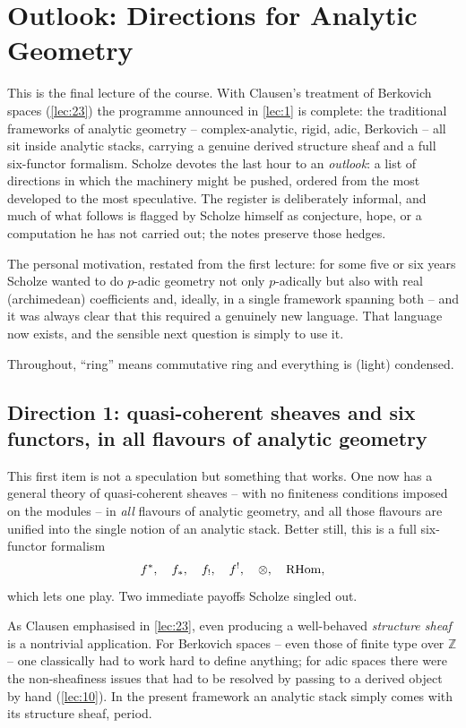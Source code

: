 \section{Outlook: Directions for Analytic Geometry}
\label{lec:24}

This is the final lecture of the course. With Clausen's treatment of Berkovich
spaces (\cref{lec:23}) the programme announced in \cref{lec:1} is complete: the
traditional frameworks of analytic geometry -- complex-analytic, rigid, adic,
Berkovich -- all sit inside analytic stacks, carrying a genuine derived
structure sheaf and a full six-functor formalism. Scholze devotes the last hour
to an \emph{outlook}: a list of directions in which the machinery might be
pushed, ordered from the most developed to the most speculative. The register
is deliberately informal, and much of what follows is flagged by Scholze himself
as conjecture, hope, or a computation he has not carried out; the notes preserve
those hedges.

The personal motivation, restated from the first lecture: for some five or six
years Scholze wanted to do $p$-adic geometry not only $p$-adically but also with
real (archimedean) coefficients and, ideally, in a single framework spanning
both -- and it was always clear that this required a genuinely new language.
That language now exists, and the sensible next question is simply to use it.

Throughout, ``ring'' means commutative ring and everything is (light) condensed.

\subsection{Direction 1: quasi-coherent sheaves and six functors, in all
flavours of analytic geometry}
\label{subsec:24:qcoh}

This first item is not a speculation but something that works. One now has a
general theory of quasi-coherent sheaves -- with no finiteness conditions
imposed on the modules -- in \emph{all} flavours of analytic geometry, and all
those flavours are unified into the single notion of an analytic stack. Better
still, this is a full six-functor formalism
\begin{equation*}
f^*,\quad f_*,\quad f_!,\quad f^!,\quad \otimes,\quad \mathrm{RHom} ,
\end{equation*}
which lets one play. Two immediate payoffs Scholze singled out.

\begin{remark}
\label{rmk:24:structure-sheaf}
As Clausen emphasised in \cref{lec:23}, even producing a well-behaved
\emph{structure sheaf} is a nontrivial application. For Berkovich spaces -- even
those of finite type over $\mathbb Z$ -- one classically had to work hard to
define anything; for adic spaces there were the non-sheafiness issues that had
to be resolved by passing to a derived object by hand (\cref{lec:10}). In the
present framework an analytic stack simply comes with its structure sheaf,
period.
\end{remark}

